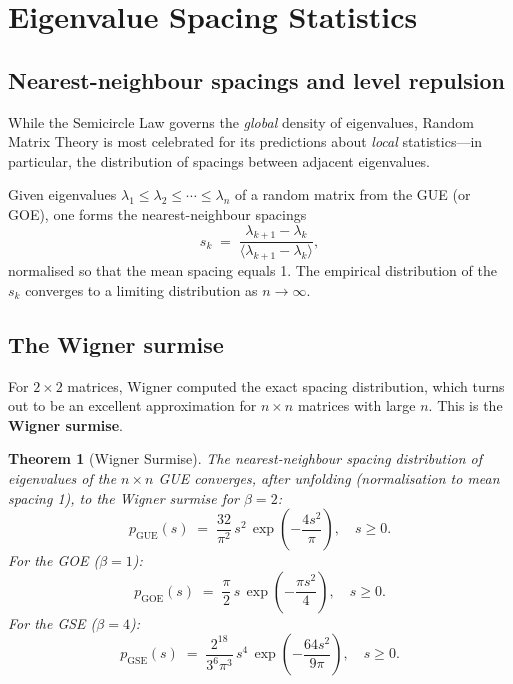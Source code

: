 \documentclass[12pt,a4paper]{amsart}
\newtheorem{theorem}{Theorem}[section]
\theoremstyle{definition}
\theoremstyle{remark}
\begin{document}
\section{Eigenvalue Spacing Statistics}
\label{sec:spacing}

\subsection{Nearest-neighbour spacings and level repulsion}

While the Semicircle Law governs the \emph{global} density of eigenvalues,
Random Matrix Theory is most celebrated for its predictions about
\emph{local} statistics---in particular, the distribution of spacings
between adjacent eigenvalues.

Given eigenvalues $\lambda_1 \leq \lambda_2 \leq \cdots \leq \lambda_n$ of
a random matrix from the GUE (or GOE), one forms the nearest-neighbour
spacings
\[
  s_k \;=\; \frac{\lambda_{k+1} - \lambda_k}{\langle \lambda_{k+1} - \lambda_k \rangle},
\]
normalised so that the mean spacing equals 1. The empirical distribution of
the $s_k$ converges to a limiting distribution as $n \to \infty$.

\subsection{The Wigner surmise}

For $2 \times 2$ matrices, Wigner \cite{Wigner1957} computed the exact spacing
distribution, which turns out to be an excellent approximation for $n \times n$
matrices with large $n$. This is the \textbf{Wigner surmise}.

\begin{theorem}[Wigner Surmise]
\label{thm:surmise}
The nearest-neighbour spacing distribution of eigenvalues of the
$n \times n$ GUE converges, after unfolding (normalisation to mean spacing 1),
to the Wigner surmise for $\beta = 2$:
\[
  p_{\mathrm{GUE}}(s) \;=\; \frac{32}{\pi^2}\,s^2\,\exp\!\left(-\frac{4s^2}{\pi}\right),
  \quad s \geq 0.
\]
For the GOE ($\beta = 1$):
\[
  p_{\mathrm{GOE}}(s) \;=\; \frac{\pi}{2}\,s\,\exp\!\left(-\frac{\pi s^2}{4}\right),
  \quad s \geq 0.
\]
For the GSE ($\beta = 4$):
\[
  p_{\mathrm{GSE}}(s) \;=\; \frac{2^{18}}{3^6\pi^3}\,s^4\,\exp\!\left(-\frac{64 s^2}{9\pi}\right),
  \quad s \geq 0.
\]
\end{theorem}
\end{document}
